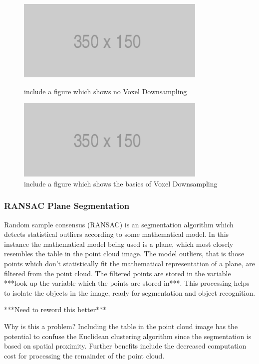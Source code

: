 \documentclass[a4paper]{article}
\begin{document}
\begin{figure}[h]
\begin{minipage}{0.45\linewidth}
\centering
\includegraphics[scale=0.5]{placeholder}
\caption{include a figure which shows no Voxel Downsampling}
\end{minipage}
\hspace{0.5cm}
\begin{minipage}{0.45\linewidth}
\centering
\includegraphics[scale=0.5]{placeholder}
\caption{include a figure which shows the basics of Voxel Downsampling}
\end{minipage}
\end{figure}

\subsubsection{RANSAC Plane Segmentation}
Random sample consensus (RANSAC) is an segmentation algorithm which detects statistical outliers according to some mathematical model. In this instance the mathematical model being used is a plane, which most closely resembles the table in the point cloud image. The model outliers, that is those points which don't statistically fit the mathematical representation of a plane, are filtered from the point cloud. The filtered points are stored in the variable ***look up the variable which the points are stored in***. This processing helps to isolate the objects in the image, ready for segmentation and object recognition.

***Need to reword this better***

Why is this a problem? Including the table in the point cloud image has the potential to confuse the Euclidean clustering algorithm since the segmentation is based on spatial proximity. Further benefits include the decreased computation cost for processing the remainder of the point cloud.
\end{document}
